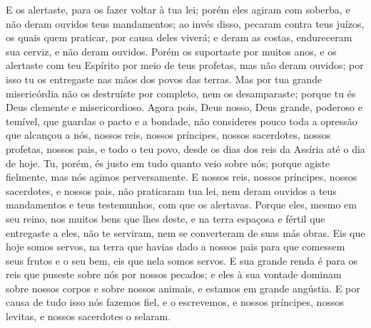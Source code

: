 {{  E os alertaste, para os fazer voltar à tua lei; porém eles agiram com soberba, e não deram ouvidos {} teus mandamentos; ao invés disso, pecaram contra teus juízos, os quais quem praticar, por causa deles viverá; e deram as costas, endureceram sua cerviz, e não deram ouvidos.
  Porém os suportaste por muitos anos, e os alertaste com teu Espírito por meio de teus profetas, mas não deram ouvidos; por isso tu os entregaste nas mãos dos povos das terras.
  Mas por tua grande misericórdia não os destruíste por completo, nem os desamparaste; porque tu és Deus clemente e misericordioso.
  Agora pois, Deus nosso, Deus grande, poderoso e temível, que guardas o pacto e a bondade, não consideres pouco toda a opressão que alcançou a nós, nossos reis, nossos príncipes, nossos sacerdotes, nossos profetas, nossos pais, e todo o teu povo, desde os dias dos reis da Assíria até o dia de hoje.
  Tu, porém, és justo em tudo quanto veio sobre nós; porque agiste fielmente, mas nós agimos perversamente.
  E nossos reis, nossos príncipes, nossos sacerdotes, e nossos pais, não praticaram tua lei, nem deram ouvidos a teus mandamentos e teus testemunhos, com que os alertavas.
  Porque eles, mesmo em seu reino, nos muitos bens que lhes deste, e na terra espaçosa e fértil que entregaste a eles, não te serviram, nem se converteram de suas más obras. %
  Eis que hoje somos servos, na terra que havias dado a nossos pais para que comessem seus frutos e o seu bem, eis que nela somos servos. %
  E sua grande renda é para os reis que puseste sobre nós por nossos pecados; e eles à sua vontade dominam sobre nossos corpos e sobre nossos animais, e estamos em grande angústia.
  E por causa de tudo isso nós fazemos {} fiel, e o escrevemos, e nossos príncipes, nossos levitas, e nossos sacerdotes o selaram}. %
\par }

